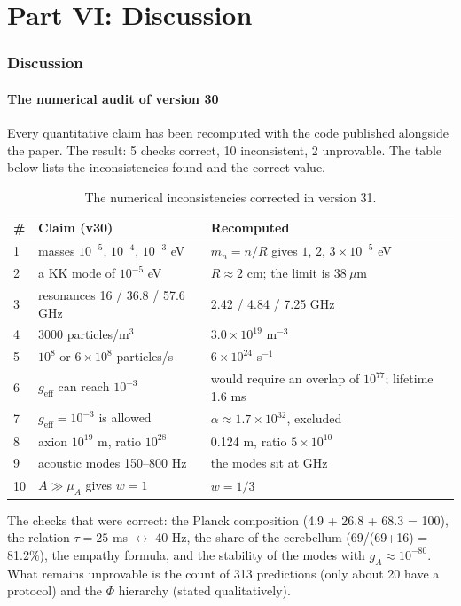 \part*{Part VI: Discussion}

\section{Discussion}
\subsection{The numerical audit of version 30}
Every quantitative claim has been recomputed with the code published alongside the paper. The result: 5 checks correct, 10 inconsistent, 2 unprovable. The table below lists the inconsistencies found and the correct value.

\begin{table}[H]
\centering
\small
\begin{tabular}{@{}p{0.5cm}p{6.2cm}p{5.2cm}@{}}
\toprule
\# & \textbf{Claim (v30)} & \textbf{Recomputed} \\ \midrule
1 & masses $10^{-5}$, $10^{-4}$, $10^{-3}$ eV & $m_n = n/R$ gives $1$, $2$, $3 \times 10^{-5}$ eV \\
2 & a KK mode of $10^{-5}$ eV & $R \approx 2$ cm; the limit is $38\ \mu$m \\
3 & resonances 16 / 36.8 / 57.6 GHz & 2.42 / 4.84 / 7.25 GHz \\
4 & 3000 particles/m$^3$ & $3.0\times10^{19}$ m$^{-3}$ \\
5 & $10^8$ or $6\times10^8$ particles/s & $6\times10^{24}$ s$^{-1}$ \\
6 & $g_{\text{eff}}$ can reach $10^{-3}$ & would require an overlap of $10^{77}$; lifetime 1.6 ms \\
7 & $g_{\text{eff}} = 10^{-3}$ is allowed & $\alpha \approx 1.7\times10^{32}$, excluded \\
8 & axion $10^{19}$ m, ratio $10^{28}$ & 0.124 m, ratio $5\times10^{10}$ \\
9 & acoustic modes 150--800 Hz & the modes sit at GHz \\
10 & $A \gg \mu_A$ gives $w = 1$ & $w = 1/3$ \\ \bottomrule
\end{tabular}
\caption{The numerical inconsistencies corrected in version 31.}
\label{tab:audit}
\end{table}

The checks that were correct: the Planck composition (4.9 + 26.8 + 68.3 = 100), the relation $\tau = 25$ ms $\leftrightarrow$ 40 Hz, the share of the cerebellum (69/(69+16) = 81.2\%), the empathy formula, and the stability of the modes with $g_A \approx 10^{-80}$. What remains unprovable is the count of 313 predictions (only about 20 have a protocol) and the $\Phi$ hierarchy (stated qualitatively).

